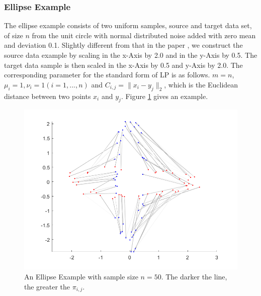 \subsubsection{Ellipse Example}
The ellipse example consists of two uniform samples, source and target data set, of size $n$ from the unit circle with normal distributed noise added with zero mean and deviation 0.1. Slightly different from that in the paper \cite{multiscale}, we construct the source data example by scaling in the x-Axis by 2.0 and in the y-Axis by 0.5. The target data sample is then scaled in the x-Axis by 0.5 and y-Axis by 2.0. The corresponding parameter for the standard form of LP is as follows. $m = n$, $\mu_i=1, \nu_i=1(i=1, ..., n)$ and $C_{i, j}=\|x_i-y_j\|_2$, which is the Euclidean distance between two points $x_i$ and $y_j$. Figure \ref{ellipse} gives an example. 
\begin{figure}[h]
\centering
\includegraphics[width=12cm]{final/ellipse1.png}
\caption{An Ellipse Example with sample size $n=50$. The darker the line, the greater the $\pi_{i, j}$.}
\label{ellipse}
\end{figure}

